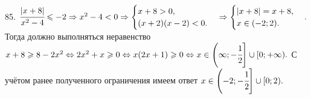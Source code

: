 85. $\cfrac{|x+8|}{x^2-4}\leqslant-2\Rightarrow x^2-4<0\Rightarrow \begin{cases}x+8>0,\\ (x+2)(x-2)<0.\end{cases} \Rightarrow\begin{cases}|x+8|=x+8,\\ x\in (-2;2).\end{cases}.$ Тогда должно выполняться неравенство $x+8\geqslant 8-2x^2 \Leftrightarrow 2x^2+x \geqslant 0 \Leftrightarrow
x(2x+1)\geqslant 0 \Leftrightarrow x\in\left(\-\infty;-\cfrac{1}{2}\right]\cup[0;+\infty).$ С учётом ранее полученного ограничения имеем ответ $x\in \left(-2;-\cfrac{1}{2}\right]\cup[0;2).$\newpage\noindent
